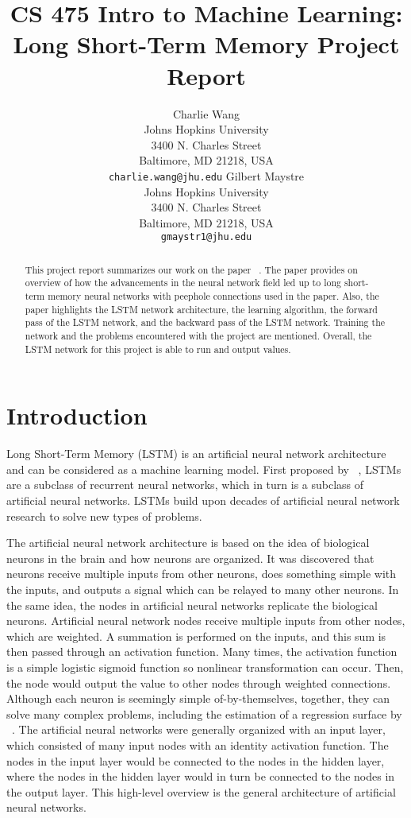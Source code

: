 \documentclass[11pt,letterpaper]{article}
\title{CS 475 Intro to Machine Learning: Long Short-Term Memory Project Report}
\author{Charlie Wang\\
	Johns Hopkins University\\
	3400 N. Charles Street\\
	Baltimore, MD 21218, USA\\
	{\tt charlie.wang@jhu.edu}
	\And
	Gilbert Maystre \\
	Johns Hopkins University\\
	3400 N. Charles Street\\
	Baltimore, MD 21218, USA\\
	{\tt gmaystr1@jhu.edu}}
\date{}
\begin{document}
	\maketitle

	\begin{abstract}
		This project report summarizes our work on the paper ~\cite{Gers:01}. The paper provides on overview of how the advancements in the neural network field led up to long short-term memory neural networks with peephole connections used in the paper. Also, the paper highlights the LSTM network architecture, the learning algorithm, the forward pass of the LSTM network, and the backward pass of the LSTM network. Training the network and the problems encountered with the project are mentioned. Overall, the LSTM network for this project is able to run and output values.
	\end{abstract}

	\section{Introduction}

	Long Short-Term Memory (LSTM) is an artificial neural network architecture and can be considered as a machine learning model. First proposed by ~\cite{Hochreiter:97}, LSTMs are a subclass of recurrent neural networks, which in turn is a subclass of artificial neural networks. LSTMs build upon decades of artificial neural network research to solve new types of problems.

	The artificial neural network architecture is based on the idea of biological neurons in the brain and how neurons are organized. It was discovered that neurons receive multiple inputs from other neurons, does something simple with the inputs, and outputs a signal which can be relayed to many other neurons. In the same idea, the nodes in artificial neural networks replicate the biological neurons. Artificial neural network nodes receive multiple inputs from other nodes, which are weighted. A summation is performed on the inputs, and this sum is then passed through an activation function. Many times, the activation function is a simple logistic sigmoid function so nonlinear transformation can occur. Then, the node would output the value to other nodes through weighted connections. Although each neuron is seemingly simple of-by-themselves, together, they can solve many complex problems, including the estimation of a regression surface by ~\cite{Specht:91}. The artificial neural networks were generally organized with an input layer, which consisted of many input nodes with an identity activation function. The nodes in the input layer would be connected to the nodes in the hidden layer, where the nodes in the hidden layer would in turn be connected to the nodes in the output layer. This high-level overview is the general architecture of artificial neural networks.
\end{document}
